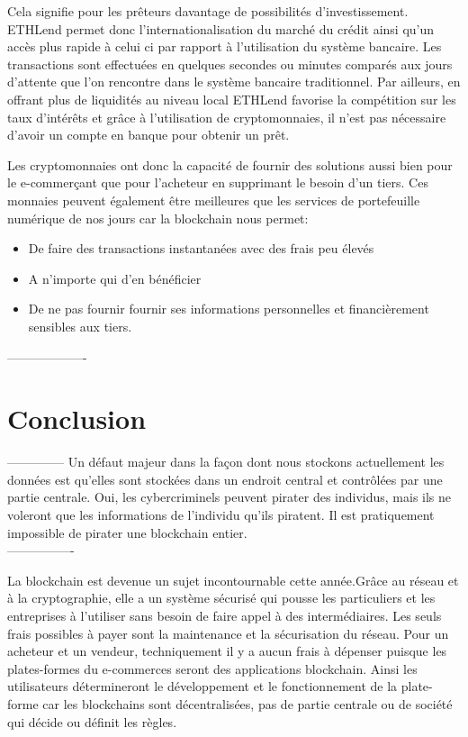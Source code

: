 \documentclass[12pt]{report}
\begin{document}
Cela signifie pour les prêteurs davantage de possibilités d’investissement. ETHLend permet donc l’internationalisation du marché du crédit ainsi qu’un accès plus rapide à celui ci par rapport à l’utilisation du système bancaire. Les transactions sont effectuées en quelques secondes ou minutes comparés aux jours d’attente que l’on rencontre dans le système bancaire traditionnel.
Par ailleurs, en offrant plus de liquidités au niveau local ETHLend favorise la compétition sur les taux d’intérêts et grâce à l’utilisation de cryptomonnaies, il n’est pas nécessaire d’avoir un compte en banque pour obtenir un prêt.

\hspace{1cm} Les cryptomonnaies ont donc la capacité de fournir des solutions aussi bien pour le e-commerçant que pour l'acheteur en supprimant  le besoin d'un tiers. Ces monnaies peuvent également être meilleures que les services de portefeuille numérique de nos jours car la blockchain nous permet: 
    \begin{itemize}
        \item De faire des transactions instantanées avec des frais peu élevés
        \item A n’importe qui d'en bénéficier
        \item De ne pas fournir fournir ses informations personnelles et financièrement sensibles aux tiers.
    \end{itemize}

-------------------


\newpage		
\section{Conclusion}

\hspace{1cm} 

--------------
Un défaut majeur dans la façon dont nous stockons actuellement les données est qu’elles sont stockées dans un endroit central et contrôlées par une partie centrale. Oui, les cybercriminels peuvent pirater des individus, mais ils ne voleront que les informations de l’individu qu’ils piratent. Il est pratiquement impossible de pirater une blockchain entier.\\
----------------

\hspace{1cm} La blockchain est devenue un sujet incontournable cette année.Grâce au réseau et à la cryptographie, elle a un système sécurisé qui pousse les particuliers et les entreprises à l'utiliser sans besoin de faire appel à des intermédiaires. Les seuls frais possibles à payer sont la maintenance et la sécurisation du réseau. Pour un acheteur et un vendeur, techniquement il y a aucun frais à dépenser puisque les plates-formes du e-commerces seront des applications blockchain. Ainsi les utilisateurs détermineront le développement et le fonctionnement de la plate-forme car les blockchains sont décentralisées, pas de partie centrale ou de société qui décide ou définit les règles.\\
\end{document}
